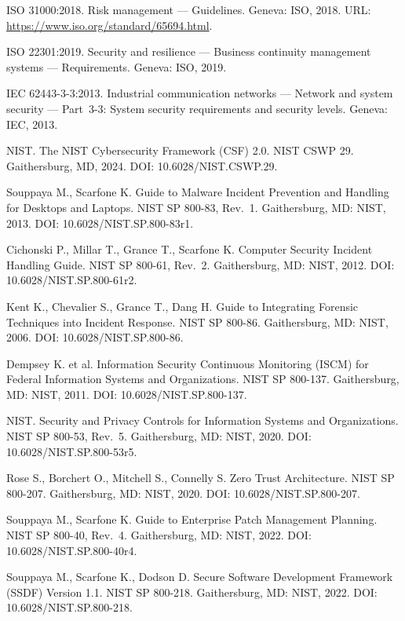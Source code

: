  ISO 31000:2018. Risk management --- Guidelines. Geneva: ISO, 2018. URL: \url{https://www.iso.org/standard/65694.html}.

 ISO 22301:2019. Security and resilience --- Business continuity management systems --- Requirements. Geneva: ISO, 2019.

 IEC 62443-3-3:2013. Industrial communication networks --- Network and system security --- Part~3-3: System security requirements and security levels. Geneva: IEC, 2013.

 NIST. The NIST Cybersecurity Framework (CSF) 2.0. NIST CSWP 29. Gaithersburg, MD, 2024. DOI: 10.6028/NIST.CSWP.29.

 Souppaya M., Scarfone K. Guide to Malware Incident Prevention and Handling for Desktops and Laptops. NIST SP 800-83, Rev.~1. Gaithersburg, MD: NIST, 2013. DOI: 10.6028/NIST.SP.800-83r1.

 Cichonski P., Millar T., Grance T., Scarfone K. Computer Security Incident Handling Guide. NIST SP 800-61, Rev.~2. Gaithersburg, MD: NIST, 2012. DOI: 10.6028/NIST.SP.800-61r2.

 Kent K., Chevalier S., Grance T., Dang H. Guide to Integrating Forensic Techniques into Incident Response. NIST SP 800-86. Gaithersburg, MD: NIST, 2006. DOI: 10.6028/NIST.SP.800-86.

 Dempsey K. et al. Information Security Continuous Monitoring (ISCM) for Federal Information Systems and Organizations. NIST SP 800-137. Gaithersburg, MD: NIST, 2011. DOI: 10.6028/NIST.SP.800-137.

 NIST. Security and Privacy Controls for Information Systems and Organizations. NIST SP 800-53, Rev.~5. Gaithersburg, MD: NIST, 2020. DOI: 10.6028/NIST.SP.800-53r5.

 Rose S., Borchert O., Mitchell S., Connelly S. Zero Trust Architecture. NIST SP 800-207. Gaithersburg, MD: NIST, 2020. DOI: 10.6028/NIST.SP.800-207.

 Souppaya M., Scarfone K. Guide to Enterprise Patch Management Planning. NIST SP 800-40, Rev.~4. Gaithersburg, MD: NIST, 2022. DOI: 10.6028/NIST.SP.800-40r4.

 Souppaya M., Scarfone K., Dodson D. Secure Software Development Framework (SSDF) Version 1.1. NIST SP 800-218. Gaithersburg, MD: NIST, 2022. DOI: 10.6028/NIST.SP.800-218.


